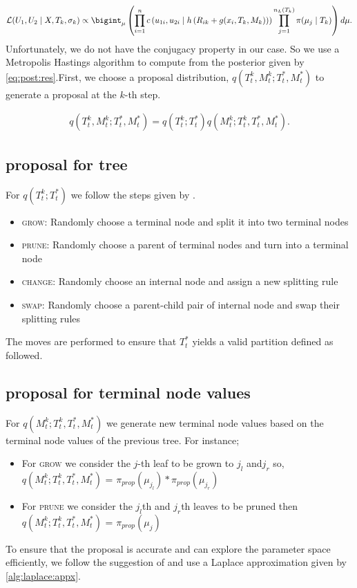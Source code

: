 \documentclass{amsart}
\begin{document}
\begin{equation*}
	\mathcal{L}(U_1,U_2\mid X, T_k, \sigma_{k})\propto \bigint_{\mu}\left(\prod_{i=1}^{n}c\left(u_{1i},u_{2i}\mid h\left(R_{ik}+g(x_i, T_k, M_k)\right)\right)\prod_{j=1}^{n_L(T_k)}\pi(\mu_j\mid T_k)\right)d\mu.
\end{equation*}
Unfortunately, we do not have the conjugacy property in our case. So we use a Metropolis Hastings algorithm to compute from the posterior given by \cref{eq:post:res}.First, we choose a proposal distribution, $q\left(T_t^k,M_t^k;T_t^\ast, M_t^\ast\right)$ to generate a proposal at the $k$-th step.

\begin{align}\label{eq:prop}
	q\left(T_t^k,M_t^k;T_t^\ast, M_t^\ast\right) = q\left(T_t^k;T_t^\ast\right) q\left(M_t^k;T_t^k, T_t^\ast, M_t^\ast\right).
\end{align}

\subsection{proposal for tree}
For $q\left(T_t^k;T_t^\ast\right)$ we follow the steps given by \citet{serafini2024lossbasedpriortreetopologies}. 

\begin{itemize}
	\item \textsc{grow}: Randomly choose a terminal node and split it into two terminal nodes
	\item \textsc{prune}: Randomly choose a parent of terminal nodes and turn into a terminal node
	\item \textsc{change}: Randomly choose an internal node and assign a new splitting rule
	\item \textsc{swap}: Randomly choose a parent-child pair of internal node and swap their splitting rules
\end{itemize}

The moves are performed to ensure that $T_t^\ast$ yields a valid partition defined as followed.

\subsection{proposal for terminal node values}
For $q\left(M_t^k;T_t^k, T_t^\ast, M_t^\ast\right)$ we generate new terminal node values based on the terminal node values of the previous tree. For instance;

\begin{itemize}
	\item For \textsc{grow} we consider the $j$-th leaf to be grown to $j_l$ and$j_r$ so,
	$q\left(M_t^k;T_t^k, T_t^\ast, M_t^\ast\right)$ = $\pi_{prop}(\mu_{j_l})*\pi_{prop}(\mu_{j_r})$
	\item For \textsc{prune} we consider the $j_l$th and $j_r$th leaves to be pruned then $q\left(M_t^k;T_t^k, T_t^\ast, M_t^\ast\right)$ = $\pi_{prop}(\mu_j)$
\end{itemize}
To ensure that the proposal is accurate and can explore the parameter space efficiently, we follow the suggestion of \citet{Linero02012025} and use a Laplace approximation given by \cref{alg:laplace:appx}.
\end{document}
